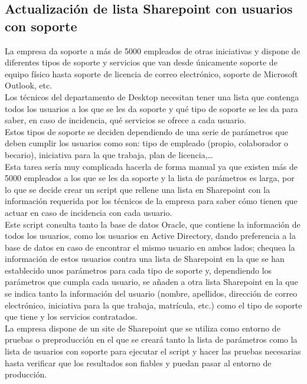 \documentclass[a4paper, 12pt]{book}
\begin{document}
\subsection{Actualización de lista Sharepoint con usuarios con soporte}
\label{Actualización de lista Sharepoint con usuarios con soporte}

La empresa da soporte a más de 5000 empleados de otras iniciativas y dispone de diferentes tipos de soporte y servicios que van desde únicamente soporte de equipo físico hasta soporte de licencia de correo electrónico, soporte de Microsoft Outlook, etc.
\\

Los técnicos del departamento de Desktop necesitan tener una lista que contenga todos los usuarios a los que se les da soporte y qué tipo de soporte se les da para saber, en caso de incidencia, qué servicios se ofrece a cada usuario.
\\

Estos tipos de soporte se deciden dependiendo de una serie de parámetros que deben cumplir los usuarios como son: tipo de empleado (propio, colaborador o becario), iniciativa para la que trabaja, plan de licencia,…
\\

Esta tarea sería muy complicada hacerla de forma manual ya que existen más de 5000 empleados a los que se les da soporte y la lista de parámetros es larga, por lo que se decide crear un script que rellene una lista en Sharepoint con la información requerida por los técnicos de la empresa para saber cómo tienen que actuar en caso de incidencia con cada usuario.
\\

Este script consulta tanto la base de datos Oracle, que contiene la información de todos los usuarios, como los usuarios en Active Directory, dando preferencia a la base de datos en caso de encontrar el mismo usuario en ambos lados; chequea la información de estos usuarios contra una lista de Sharepoint en la que se han establecido unos parámetros para cada tipo de soporte y, dependiendo los parámetros que cumpla cada usuario, se añaden a otra lista Sharepoint en la que se indica tanto la información del usuario (nombre, apellidos, dirección de correo electrónico, iniciativa para la que trabaja, matrícula, etc.) como el tipo de soporte que tiene y los servicios contratados.
\\

La empresa dispone de un site de Sharepoint que se utiliza como entorno de pruebas o preproducción en el que se creará tanto la lista de parámetros como la lista de usuarios con soporte para ejecutar el script y hacer las pruebas necesarias hasta verificar que los resultados son fiables y puedan pasar al entorno de producción.
\end{document}

